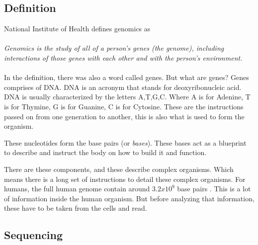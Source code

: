 \documentclass{article}
\begin{document}
\subsection{Definition}
National Institute of Health \autocite{genomics-definition} defines genomics as \\ \\
\textit{Genomics is the study of all of a person's genes (the genome), including interactions of those genes with each other and with the person's environment.} \\ \\


In the definition, there was also a word called genes. But what are genes? Genes comprises of DNA. DNA is an acronym that stands for deoxyribonucleic acid. DNA is usually characterized by the letters A,T,G,C. Where A is for Adenine, T is for Thymine, G is for Guanine, C is for Cytosine. These are the instructions passed on from one generation to another, this is also what is used to form the organism. \autocite[p.~2]{hartl2018}


These nucleotides
form the base pairs (or \textit{bases}). These bases act as a blueprint to describe and instruct the body on how to build it and function.\autocite{alberts_mole}

There are these components, and these describe complex organisms. Which means there is a long set of instructions to detail these complex organisms. For humans, the full human genome contain around $3.2x10^9$ base pairs \autocite{introgenomics}. This is a lot of information inside the human organism. But before analyzing that information, these have to be taken from the cells and read.




\subsection{Sequencing}
\end{document}
